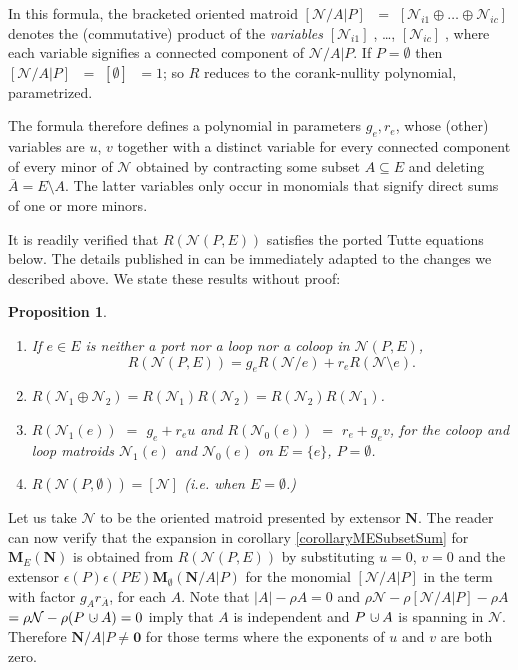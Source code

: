 \documentclass[12pt]{article}
\newtheorem{proposition}[theorem]{Proposition}
\theoremstyle{definition}
\newcommand{\MVAR}[1]{{[#1]\;}}
\newcommand{\dunion}
{\mbox{\hbox{\hskip6pt$\cdot$\hskip-5.50pt$\cup$\hskip2pt}}}
\newcommand{\scomp}[1]{\ensuremath{\overline{#1}}}
\newcommand{\Rank}{{\rho}}%
\newcommand{\Card}[1]{\ensuremath{{\left|#1\right|}}}
\newcommand{\ext}[1]{\ensuremath{\mathbf{#1}}}
\begin{document}
In this formula, the bracketed oriented matroid 
$\MVAR{\mathcal{N}/A|P}$ $=$ 
$\MVAR{\mathcal{N}_{i1}\oplus\ldots\oplus\mathcal{N}_{ic}}$ denotes the
(commutative) product of the \textit{variables}
$\MVAR{\mathcal{N}_{i1}}$,  \ldots, $\MVAR{\mathcal{N}_{ic}}$, where each 
variable signifies a connected component of $\mathcal{N}/A|P$.  If
$P=\emptyset$ then $\MVAR{\mathcal{N}/A|P}$ $=$ 
$\MVAR{\emptyset}$ $= 1$; so
$R$ reduces to the corank-nullity polynomial, parametrized.

The formula 
therefore defines a polynomial in parameters $g_e,r_e$, whose 
(other) variables are $u$, $v$ together with a distinct variable for every
connected component of every minor of $\mathcal{N}$ obtained by
contracting some subset $A\subseteq E$ and deleting
$\scomp{A}=E\setminus A$.  The latter variables only occur
in monomials that signify direct sums of one or more minors.

It is readily verified that $R(\mathcal{N}(P,E))$ satisfies the 
ported Tutte equations below. 
The details
published in \cite{sdcPorted} can be immediately adapted 
to the changes we described above.
We state these results without proof:

\begin{proposition}
\label{RankPolyPortedTutteEq}
\begin{enumerate}
\item 
If $e\in E$ is neither a port nor a loop nor a coloop in $\mathcal{N}(P,E)$,
\begin{equation}
R(\mathcal{N}(P,E)) = g_eR(\mathcal{N}/e) + r_eR(\mathcal{N}\setminus e).
\end{equation}
\item
$R(\mathcal{N}_1\oplus\mathcal{N}_2) = R(\mathcal{N}_1)R(\mathcal{N}_2) =
R(\mathcal{N}_2)R(\mathcal{N}_1)$.
\item $R(\mathcal{N}_1(e))$ $=$ $g_e + r_eu$ and
$R(\mathcal{N}_0(e))$ $=$ $r_e + g_ev$, for the coloop and loop matroids
$\mathcal{N}_1(e)$ and $\mathcal{N}_0(e)$ on $E=\{e\}$, $P=\emptyset$.
\item
$R(\mathcal{N}(P,\emptyset)) = [\mathcal{N}]$ (i.e. when $E=\emptyset$.)
\end{enumerate}
\end{proposition}

Let us take $\mathcal{N}$ to be the oriented matroid
presented by extensor $\ext{N}$.
The reader can now verify that the expansion
in corollary \ref{corollaryMESubsetSum} 
for $\ext{M}_E(\ext{N})$
is obtained from
$R(\mathcal{N}(P,E))$ by substituting $u=0$, $v=0$ and the
extensor $\epsilon(P)\epsilon(PE)\ext{M}_\emptyset(\ext{N}/A|P)$
for the monomial $[\mathcal{N}/A|P]$ in the term with
factor $g_Ar_{\scomp{A}}$, for each $A$.  Note that 
$\Card{A}-\Rank{A}=0$ and 
$\Rank{\mathcal{N}}-\Rank{[\mathcal{N}/A|P]}-\Rank{A}$ 
$=\Rank{\mathcal{N}}-\Rank{(P\dunion A)} = 0$
imply that $A$ is independent and $P\dunion A$ is spanning
in $\mathcal{N}$. 
Therefore $\ext{N}/A|P\neq\ext{0}$ for those terms where
the exponents of $u$ and $v$ are both zero.
\end{document}

